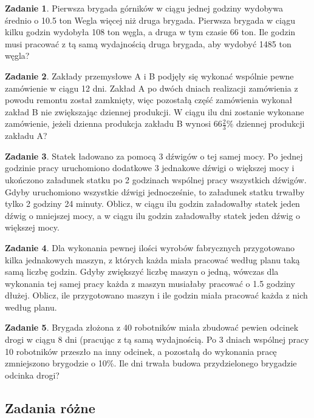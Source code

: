 \documentclass[11pt]{article}
\theoremstyle{definition}
\newtheorem{zad}{Zadanie}
\begin{document}
\begin{zad}
Pierwsza brygada górników w ciągu jednej godziny wydobywa średnio o 10.5 ton Wegla więcej niż druga brygada. Pierwsza brygada w ciągu kilku godzin wydobyła 108 ton węgla, a druga w tym czasie 66 ton. Ile godzin musi pracować z tą samą wydajnością druga brygada, aby wydobyć 1485 ton węgla?
\end{zad}

\begin{zad}
Zakłady przemysłowe A i B podjęły się wykonać wspólnie pewne zamówienie w ciągu 12 dni. Zakład A po dwóch dniach realizacji zamówienia z powodu remontu został zamknięty, więc pozostałą część zamówienia wykonał zakład B nie zwiększając dziennej produkcji. W ciągu ilu dni zostanie wykonane zamówienie, jeżeli dzienna produkcja zakładu B wynosi $66\frac23\%$ dziennej produkcji zakładu A?
\end{zad}

\begin{zad}
Statek ładowano za pomocą 3 dźwigów o tej samej mocy. Po jednej godzinie pracy uruchomiono dodatkowe 3 jednakowe dźwigi o większej mocy i ukończono załadunek statku po 2 godzinach wspólnej pracy wszystkich dźwigów. Gdyby uruchomiono wszystkie dźwigi jednocześnie, to załadunek statku trwałby tylko 2 godziny 24 minuty. Oblicz, w ciągu ilu godzin załadowałby statek jeden dźwig o mniejszej mocy, a w ciągu ilu godzin załadowałby statek jeden dźwig o większej mocy.
\end{zad}

\begin{zad}
Dla wykonania pewnej ilości wyrobów fabrycznych przygotowano kilka jednakowych maszyn, z których każda miała pracować według planu taką samą liczbę godzin. Gdyby zwiększyć liczbę maszyn o jedną, wówczas dla wykonania tej samej pracy każda z maszyn musiałaby pracować o 1.5 godziny dłużej. Oblicz, ile przygotowano maszyn i ile godzin miała pracować każda z nich według planu.
\end{zad}

\begin{zad}
Brygada złożona z 40 robotników miała zbudować pewien odcinek drogi w ciągu 8 dni (pracując z tą samą wydajnością. Po 3 dniach wspólnej pracy 10 robotników przeszło na inny odcinek, a pozostałą do wykonania pracę zmniejszono brygodzie o 10\%. Ile dni trwała budowa przydzielonego brygadzie odcinka drogi?
\end{zad}

\subsection{Zadania różne}
\end{document}
